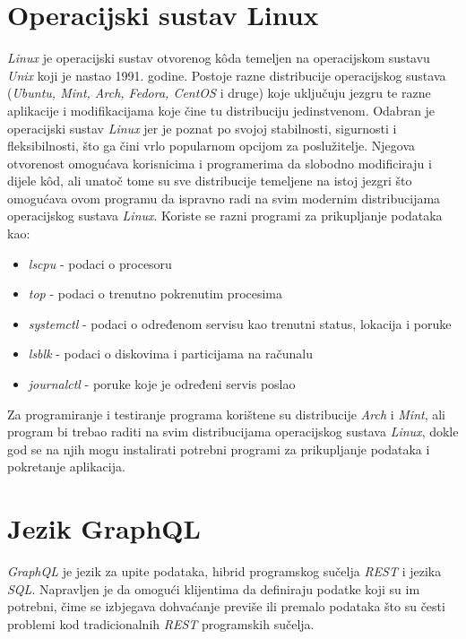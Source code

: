 \documentclass[zavrsnirad]{fer}
\begin{document}
\section{Operacijski sustav Linux}
\textit{Linux} je operacijski sustav otvorenog kôda temeljen na operacijskom sustavu \textit{Unix} koji je nastao 1991. godine. Postoje razne distribucije operacijskog sustava (\textit{Ubuntu, Mint, Arch, Fedora, CentOS} i druge) koje uključuju jezgru te razne aplikacije i modifikacijama koje čine tu distribuciju jedinstvenom. Odabran je operacijski sustav \textit{Linux} jer je poznat po svojoj stabilnosti, sigurnosti i fleksibilnosti, što ga čini vrlo popularnom opcijom za poslužitelje. Njegova otvorenost omogućava korisnicima i programerima da slobodno modificiraju i dijele kôd, ali unatoč tome su sve distribucije temeljene na istoj jezgri što omogućava ovom programu da ispravno radi na svim modernim distribucijama operacijskog sustava \textit{Linux}.
Koriste se razni programi za prikupljanje podataka kao:
\begin{itemize}
	\item  \textit{lscpu} - podaci o procesoru
	\item \textit{top} - podaci o trenutno pokrenutim procesima
	\item \textit{systemctl} - podaci o određenom servisu kao trenutni status, lokacija i poruke
	\item \textit{lsblk} -  podaci o diskovima i particijama na računalu
	\item \textit{journalctl} - poruke koje je određeni servis poslao
\end{itemize}

Za programiranje i testiranje programa korištene su distribucije \textit{Arch} i \textit{Mint}, ali program bi trebao raditi na svim distribucijama operacijskog sustava \textit{Linux}, dokle god se na njih mogu instalirati potrebni programi za prikupljanje podataka i pokretanje aplikacija.

\section{Jezik GraphQL}
\textit{GraphQL} je jezik za upite podataka, hibrid programskog sučelja \textit{REST} i jezika \textit{SQL}. Napravljen je da omogući klijentima da definiraju podatke koji su im potrebni, čime se izbjegava dohvaćanje previše ili premalo podataka što su česti problemi kod tradicionalnih \textit{REST} programskih sučelja.
\end{document}
